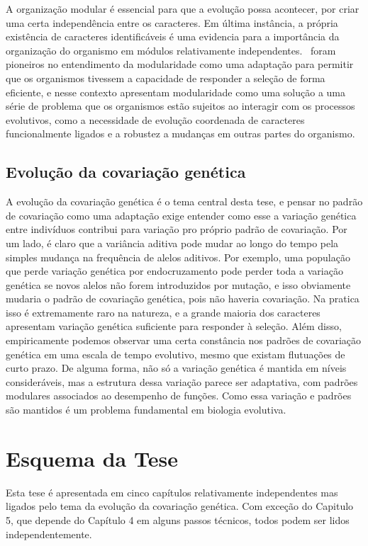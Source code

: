 \begin{refsection}
A organização modular é essencial para que a evolução possa acontecer, por
criar uma certa independência entre os caracteres. Em última instância, a
própria existência de caracteres identificáveis é uma evidencia para a
importância da organização do organismo em módulos relativamente
independentes.~\textcite{Wagner1996-ui} foram pioneiros no entendimento da
modularidade como uma adaptação para permitir que os organismos tivessem a
capacidade de responder a seleção de forma eficiente, e nesse contexto apresentam
modularidade como uma solução a uma série de problema que os organismos estão
sujeitos ao interagir com os processos evolutivos, como a necessidade de
evolução coordenada de caracteres funcionalmente ligados e a robustez a
mudanças em outras partes do organismo.

\subsection{Evolução da covariação genética}

A evolução da covariação genética é o tema central desta tese, e pensar no
padrão de covariação como uma adaptação exige entender como esse a variação
genética entre indivíduos contribui para variação pro próprio padrão de
covariação. Por um lado, é claro que a variância aditiva pode mudar ao longo
do tempo pela simples mudança na frequência de alelos aditivos. Por exemplo,
uma população que perde variação genética por endocruzamento pode  perder toda
a variação genética se novos alelos não forem introduzidos por mutação, e isso
obviamente mudaria o padrão de covariação genética, pois não haveria
covariação. Na pratica isso é extremamente raro na natureza, e a grande
maioria dos caracteres apresentam variação genética suficiente para responder
à seleção. Além disso, empiricamente podemos observar uma certa constância nos
padrões de covariação genética em uma escala de tempo evolutivo, mesmo que
existam flutuações de curto prazo. De alguma forma, não só a variação genética
é mantida em níveis consideráveis, mas a estrutura dessa variação parece ser
adaptativa, com padrões modulares associados ao desempenho de funções. Como
essa variação e padrões são mantidos é um problema fundamental em biologia
evolutiva.

\section{Esquema da Tese}

Esta tese é apresentada em cinco capítulos relativamente independentes mas
ligados pelo tema da evolução da covariação genética. Com exceção do Capitulo
5, que depende do Capítulo 4 em alguns passos técnicos, todos podem ser lidos
independentemente. 


\end{refsection}
